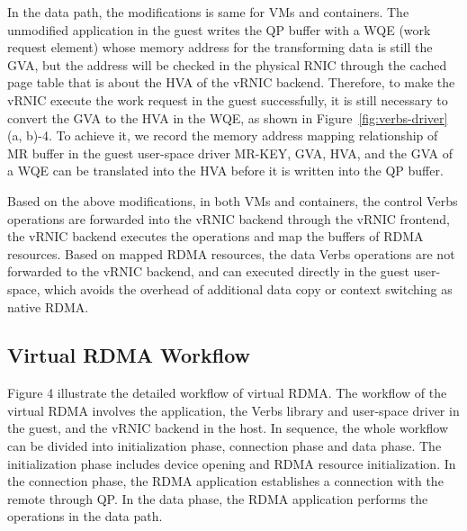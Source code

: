 In the data path, the modifications is same for VMs and containers. The unmodified application in the guest writes the QP buffer with a WQE (work request element) whose memory address for the transforming data is still the GVA, but the address will be checked in the physical RNIC through the cached page table that is about the HVA of the vRNIC backend. Therefore, to make the vRNIC execute the work request in the guest successfully, it is still necessary to convert the GVA to the HVA in the WQE, as shown in Figure~\ref{fig:verbs-driver} (a, b)-4. To achieve it, we record the memory address mapping relationship of MR buffer in the guest user-space driver {MR-KEY, GVA, HVA}, and the GVA of a WQE can be translated into the HVA before it is written into the QP buffer.

Based on the above modifications, in both VMs and containers, the control Verbs operations are forwarded into the vRNIC backend through the vRNIC frontend, the vRNIC backend executes the operations and map the buffers of RDMA resources. Based on mapped RDMA resources, the data Verbs operations are not forwarded to the vRNIC backend, and can executed directly in the guest user-space, which avoids the overhead of additional data copy or context switching as native RDMA.

\subsection{Virtual RDMA Workflow}
Figure 4 illustrate the detailed workflow of virtual RDMA. The workflow of the virtual RDMA involves the application, the Verbs library and user-space driver in the guest, and the vRNIC backend in the host. In sequence, the whole workflow can be divided into initialization phase, connection phase and data phase. The initialization phase includes device opening and RDMA resource initialization. In the connection phase, the RDMA application establishes a connection with the remote through QP. In the data phase, the RDMA application performs the operations in the data path.


